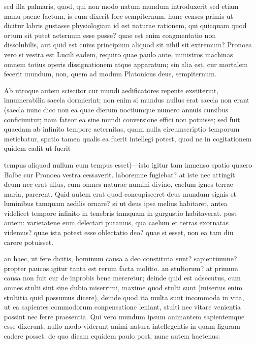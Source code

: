  sed illa palmaris, quod, qui non modo natum mundum introduxerit sed etiam manu paene factum, is eum dixerit fore sempiternum. hunc censes primis ut dicitur labris gustasse physiologiam id est naturae rationem, qui quicquam quod ortum sit putet aeternum esse posse? quae est enim coagmentatio non dissolubilis, aut quid est cuius principium aliquod sit nihil sit extremum? Pronoea vero si vestra est Lucili eadem, requiro quae paulo ante, ministros machinas omnem totius operis dissignationem atque apparatum; sin alia est, cur mortalem fecerit mundum, non, quem ad modum Platonicus deus, sempiternum.

 Ab utroque autem sciscitor cur mundi aedificatores repente exstiterint, innumerabilia saecla dormierint; non enim si mundus nullus erat saecla non erant (saecla nunc dico non ea quae dierum noctiumque numero annuis cursibus conficiuntur; nam fateor ea sine mundi conversione effici non potuisse; sed fuit quaedam ab infinito tempore aeternitas, quam nulla circumscriptio temporum metiebatur, spatio tamen qualis ea fuerit intellegi potest, quod ne in cogitationem quidem cadit ut fuerit

 tempus aliquod nullum cum tempus esset)—isto igitur tam inmenso spatio quaero Balbe cur Pronoea vestra cessaverit. laboremne fugiebat? at iste nec attingit deum nec erat ullus, cum omnes naturae numini divino, caelum ignes terrae maria, parerent. Quid autem erat quod concupisceret deus mundum signis et luminibus tamquam aedilis ornare? si ut deus ipse melius habitaret, antea videlicet tempore infinito in tenebris tamquam in gurgustio habitaverat. post autem: varietatene eum delectari putamus, qua caelum et terras exornatas videmus? quae ista potest esse oblectatio deo? quae si esset, non ea tam diu carere potuisset.

 an haec, ut fere dicitis, hominum causa a deo constituta sunt? sapientiumne? propter paucos igitur tanta est rerum facta molitio. an stultorum? at primum causa non fuit cur de inprobis bene mereretur; deinde quid est adsecutus, cum omnes stulti sint sine dubio miserrimi, maxime quod stulti sunt (miserius enim stultitia quid possumus dicere), deinde quod ita multa sunt incommoda in vita, ut ea sapientes commodorum conpensatione leniant, stulti nec vitare venientia possint nec ferre praesentia. Qui vero mundum ipsum animantem sapientemque esse dixerunt, nullo modo viderunt animi natura intellegentis in quam figuram cadere posset. de quo dicam equidem paulo post, nunc autem hactenus:

